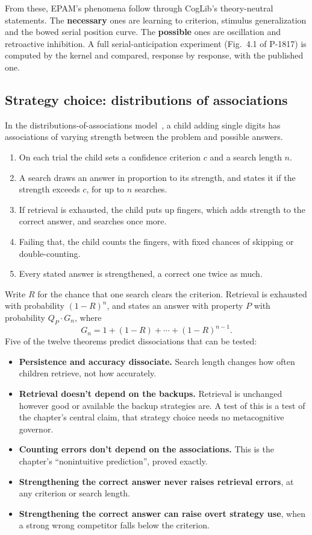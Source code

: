 \documentclass[11pt]{article}
\begin{document}
From these, EPAM's phenomena follow through CogLib's theory-neutral statements. The \textbf{necessary} ones are learning to criterion, stimulus generalization and the bowed serial position curve. The \textbf{possible} ones are oscillation and retroactive inhibition. A full serial-anticipation experiment (Fig.~4.1 of P-1817) is computed by the kernel and compared, response by response, with the published one.

\subsection{Strategy choice: distributions of associations}

In the distributions-of-associations model~\cite{siegler1984}, a child adding single digits has associations of varying strength between the problem and possible answers.
\begin{enumerate}
  \item On each trial the child sets a confidence criterion $c$ and a search length $n$.
  \item A search draws an answer in proportion to its strength, and states it if the strength exceeds $c$, for up to $n$ searches.
  \item If retrieval is exhausted, the child puts up fingers, which adds strength to the correct answer, and searches once more.
  \item Failing that, the child counts the fingers, with fixed chances of skipping or double-counting.
  \item Every stated answer is strengthened, a correct one twice as much.
\end{enumerate}

Write $R$ for the chance that one search clears the criterion. Retrieval is exhausted with probability $(1-R)^n$, and states an answer with property $P$ with probability $Q_P \cdot G_n$, where
\[
  G_n = 1 + (1-R) + \cdots + (1-R)^{n-1}.
\]
Five of the twelve theorems predict dissociations that can be tested:
\begin{itemize}
  \item \textbf{Persistence and accuracy dissociate.} Search length changes how often children retrieve, not how accurately.
  \item \textbf{Retrieval doesn't depend on the backups.} Retrieval is unchanged however good or available the backup strategies are. A test of this is a test of the chapter's central claim, that strategy choice needs no metacognitive governor.
  \item \textbf{Counting errors don't depend on the associations.} This is the chapter's ``nonintuitive prediction'', proved exactly.
  \item \textbf{Strengthening the correct answer never raises retrieval errors}, at any criterion or search length.
  \item \textbf{Strengthening the correct answer can raise overt strategy use}, when a strong wrong competitor falls below the criterion.
\end{itemize}
\end{document}
